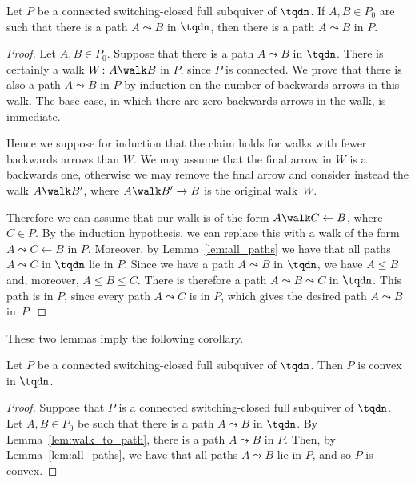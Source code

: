 \begin{lemma}\label{lem:walk_to_path}
Let $P$ be a connected switching-closed full subquiver of $\tqdn$. If $A,B \in P_{0}$ are such that there is a path $A \leadsto B$ in $\tqdn$, then there is a path $A \leadsto B$ in $P$.
\end{lemma}
\begin{proof}
Let $A,B \in P_{0}$. Suppose that there is a path $A \leadsto B$ in $\tqdn$. There is certainly a walk $W \colon A \walk B$ in $P$, since $P$ is connected. We prove that there is also a path $A \leadsto B$ in $P$ by induction on the number of backwards arrows in this walk. The base case, in which there are zero backwards arrows in the walk, is immediate.

Hence we suppose for induction that the claim holds for walks with fewer backwards arrows than $W$. We may assume that the final arrow in $W$ is a backwards one, otherwise we may remove the final arrow and consider instead the walk $A \walk B'$, where $A \walk B' \rightarrow B$ is the original walk~$W$.

Therefore we can assume that our walk is of the form $A \walk C \leftarrow B$, where $C \in P$. By the induction hypothesis, we can replace this with a walk of the form $A \leadsto C \leftarrow B$ in $P$. Moreover, by Lemma~\ref{lem:all_paths} we have that all paths $A \leadsto C$ in $\tqdn$ lie in $P$. Since we have a path $A \leadsto B$ in $\tqdn$, we have $A \leqslant B$ and, moreover, $A \leqslant B \leqslant C$. There is therefore a path $A \leadsto B \leadsto C$ in $\tqdn$. This path is in $P$, since every path $A \leadsto C$ is in $P$, which gives the desired path $A \leadsto B$ in~$P$.
\end{proof}

These two lemmas imply the following corollary.

\begin{coro}\label{cor:switch+con->conv}
Let $P$ be a connected switching-closed full subquiver of $\tqdn$. Then $P$ is convex in $\tqdn$.
\end{coro}
\begin{proof}
Suppose that $P$ is a connected switching-closed full subquiver of $\tqdn$. Let $A, B \in P_{0}$ be such that there is a path $A \leadsto B$ in $\tqdn$. By Lemma~\ref{lem:walk_to_path}, there is a path $A \leadsto B$ in $P$. Then, by Lemma~\ref{lem:all_paths}, we have that all paths $A \leadsto B$ lie in $P$, and so $P$ is convex.
\end{proof}


